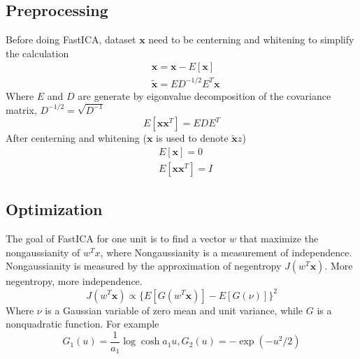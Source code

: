 \documentclass[11pt]{article}
\begin{document}
\subsection{Preprocessing}
Before doing FastICA, dataset $\mathbf{x}$ need to be centerning and whitening to simplify the calculation
$$
\begin{aligned}
    &\mathbf{x} = \mathbf{x} - E[\mathbf{x}]\\
    &\tilde{\mathbf{x}} = ED^{-1/2}E^T\mathbf{x}
\end{aligned}
$$
Where $E$ and $D$ are generate by eigonvalue decomposition of the covariance matrix, $D^{-1/2}=\sqrt{D^{-1}}$
$$
E[\mathbf{x}\mathbf{x}^T] = EDE^T
$$
After centerning and whitening ($\mathbf{x}$ is used to denote $\tilde{\mathbf{x}}z$)
$$
\begin{aligned}
    &E[\mathbf{x}] = 0\\
    &E[\mathbf{x}\mathbf{x}^T] = I
\end{aligned}
$$
\subsection{Optimization}
The goal of FastICA for one unit is to find a vector $w$ that maximize the nongaussianity of $w^Tx$, where
Nongaussianity is a measurement of independence. \\
Nongaussianity is measured by the approximation of negentropy $J(w^T\mathbf{x})$. 
More negentropy, more independence.
$$
J(w^T\mathbf{x}) \propto \{E[G(w^T\mathbf{x})]-E[G(\nu)]\}^2
$$
Where $\nu$ is a Gaussian variable of zero mean and unit variance, while $G$ is a nonquadratic function.
For example
$$
G_1(u)=\frac{1}{a_1} \log\cosh a_1u, G_2(u)=-\exp(-u^2/2)
$$
\end{document}
